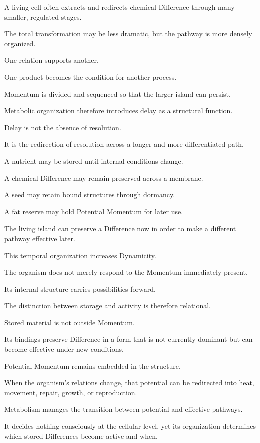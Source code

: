 A living cell often extracts and redirects chemical Difference through many smaller, regulated stages.

The total transformation may be less dramatic, but the pathway is more densely organized.

One relation supports another.

One product becomes the condition for another process.

Momentum is divided and sequenced so that the larger island can persist.

Metabolic organization therefore introduces delay as a structural function.

Delay is not the absence of resolution.

It is the redirection of resolution across a longer and more differentiated path.

A nutrient may be stored until internal conditions change.

A chemical Difference may remain preserved across a membrane.

A seed may retain bound structures through dormancy.

A fat reserve may hold Potential Momentum for later use.

The living island can preserve a Difference now in order to make a different pathway effective later.

This temporal organization increases Dynamicity.

The organism does not merely respond to the Momentum immediately present.

Its internal structure carries possibilities forward.

The distinction between storage and activity is therefore relational.

Stored material is not outside Momentum.

Its bindings preserve Difference in a form that is not currently dominant but can become effective under new conditions.

Potential Momentum remains embedded in the structure.

When the organism’s relations change, that potential can be redirected into heat, movement, repair, growth, or reproduction.

Metabolism manages the transition between potential and effective pathways.

It decides nothing consciously at the cellular level, yet its organization determines which stored Differences become active and when.

